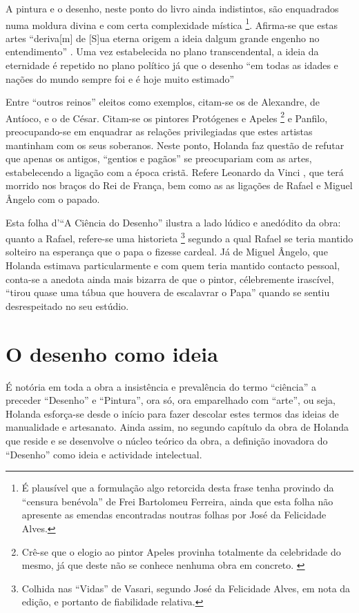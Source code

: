 \documentclass{article}
\begin{document}
A pintura e o desenho, neste ponto do livro ainda indistintos, são
enquadrados numa moldura divina e com certa complexidade
mística \footnote{É plausível que a formulação algo retorcida desta
  frase tenha provindo da ``censura benévola'' de Frei Bartolomeu
  Ferreira, ainda que esta folha não apresente as emendas encontradas
  noutras folhas por José da Felicidade Alves.}. Afirma-se que estas
artes ``deriva[m] de [S]ua eterna origem a ideia dalgum grande engenho
no entendimento'' \cite[fl.34r]{holanda}. Uma vez estabelecida no
plano transcendental, a ideia da eternidade é repetido no plano
político já que o desenho ``em todas as idades e nações do mundo
sempre foi e é hoje muito estimado'' \cite[fl.34r]{holanda}

Entre ``outros reinos'' eleitos como exemplos, citam-se os de
Alexandre, de Antíoco, e o de César. Citam-se os pintores Protógenes e
Apeles \footnote{Crê-se que o elogio ao pintor Apeles provinha
  totalmente da celebridade do mesmo, já que deste não se conhece
  nenhuma obra em concreto. \cite{calado}} e Panfilo, preocupando-se
em enquadrar as relações privilegiadas que estes artistas mantinham
com os seus soberanos. Neste ponto, Holanda faz questão de refutar que
apenas os antigos, ``gentios e pagãos'' se preocupariam com as artes,
estabelecendo a ligação com a época cristã. Refere Leonardo da Vinci ,
que terá morrido nos braços do Rei de França, bem como as as ligações
de Rafael e Miguel Ângelo com o papado.

Esta folha d'``A Ciência do Desenho'' ilustra a lado lúdico e
anedódito da obra: quanto a Rafael, refere-se uma
historieta \footnote{Colhida nas ``Vidas'' de Vasari, segundo José da
  Felicidade Alves, em nota da edição, e portanto de fiabilidade
  relativa. } segundo a qual Rafael se teria mantido solteiro na
esperança que o papa o fizesse cardeal. Já de Miguel Ângelo, que
Holanda estimava particularmente e com quem teria mantido contacto
pessoal, conta-se a anedota ainda mais bizarra de que o pintor,
célebremente irascível, ``tirou quase uma tábua que houvera de
escalavrar o Papa'' quando se sentiu desrespeitado no seu estúdio.

\section{O desenho como ideia}

É notória em toda a obra a insistência e prevalência do termo
``ciência'' a preceder ``Desenho'' e ``Pintura'', ora só, ora
emparelhado com ``arte'', ou seja, Holanda esforça-se desde o início
para fazer descolar estes termos das ideias de manualidade e
artesanato. Ainda assim, no segundo capítulo da obra de Holanda que
reside e se desenvolve o núcleo teórico da obra, a definição inovadora
do ``Desenho'' como ideia e actividade intelectual.
\end{document}
